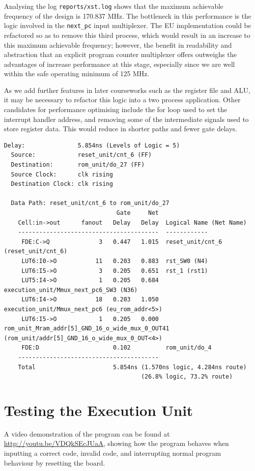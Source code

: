 \documentclass[12pt,a4paper]{article}
\begin{document}
Analysing the log \texttt{reports/xst.log} shows that the maximum
achievable frequency of the design is 170.837 MHz. The bottleneck in
this performance is the logic involved in the \texttt{next\_pc} input
multiplexer. The EU implementation could be refactored so as to remove
this third process, which would result in an increase to this maximum
achievable frequency; however, the benefit in readability and
abstraction that an explicit program counter multiplexer offers
outweighs the advantages of increase performance at this stage,
especially since we are well within the safe operating minimum of 125
MHz.

As we add further features in later courseworks such as the register
file and ALU, it may be necessary to refactor this logic into a two
process application. Other candidates for performance optimising
include the for loop used to set the interrupt handler address, and
removing some of the intermediate signals used to store register
data. This would reduce in shorter paths and fewer gate delays.

\newpage
\begin{verbatim}
Delay:               5.854ns (Levels of Logic = 5)
  Source:            reset_unit/cnt_6 (FF)
  Destination:       rom_unit/do_27 (FF)
  Source Clock:      clk rising
  Destination Clock: clk rising

  Data Path: reset_unit/cnt_6 to rom_unit/do_27
                                Gate     Net
    Cell:in->out      fanout   Delay   Delay  Logical Name (Net Name)
    ----------------------------------------  ------------
     FDE:C->Q              3   0.447   1.015  reset_unit/cnt_6 (reset_unit/cnt_6)
     LUT6:I0->O           11   0.203   0.883  rst_SW0 (N4)
     LUT6:I5->O            3   0.205   0.651  rst_1 (rst1)
     LUT5:I4->O            1   0.205   0.684  execution_unit/Mmux_next_pc6_SW3 (N36)
     LUT6:I4->O           18   0.203   1.050  execution_unit/Mmux_next_pc6 (eu_rom_addr<5>)
     LUT6:I5->O            1   0.205   0.000  rom_unit_Mram_addr[5]_GND_16_o_wide_mux_0_OUT41 (rom_unit/addr[5]_GND_16_o_wide_mux_0_OUT<4>)
     FDE:D                     0.102          rom_unit/do_4
    ----------------------------------------
    Total                      5.854ns (1.570ns logic, 4.284ns route)
                                       (26.8% logic, 73.2% route)
\end{verbatim}

\section{Testing the Execution Unit}

A video demonstration of the program can be found at
\url{http://youtu.be/VDQkSEcJUaA}, showing how the program behaves when
inputting a correct code, invalid code, and interrupting normal
program behaviour by resetting the board.
\end{document}
